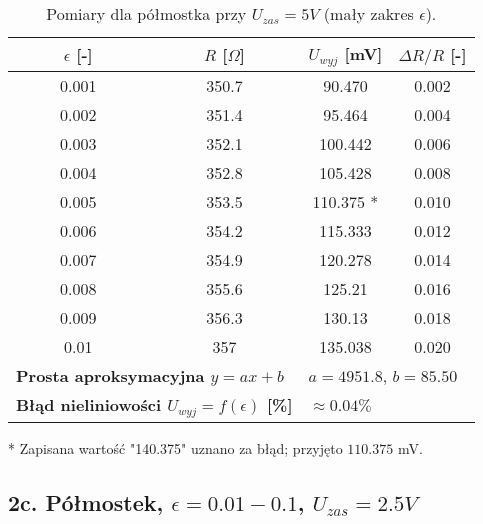 \documentclass[12pt, a4paper]{article}
\begin{document}
	\begin{table}[H]
		\centering
		\caption{Pomiary dla półmostka przy $U_{zas} = 5 V$ (mały zakres $\epsilon$).}
		\begin{tabular}{cccc}
			\toprule
			$\epsilon$ [-] & $R$ [$\Omega$] & $U_{wyj}$ [mV] & $\Delta R/R$ [-] \\
			\midrule
			0.001 & 350.7 & 90.470 & 0.002 \\
			0.002 & 351.4 & 95.464 & 0.004 \\
			0.003 & 352.1 & 100.442 & 0.006 \\
			0.004 & 352.8 & 105.428 & 0.008 \\
			0.005 & 353.5 & 110.375 * & 0.010 \\
			0.006 & 354.2 & 115.333 & 0.012 \\
			0.007 & 354.9 & 120.278 & 0.014 \\
			0.008 & 355.6 & 125.21 & 0.016 \\
			0.009 & 356.3 & 130.13 & 0.018 \\
			0.01 & 357 & 135.038 & 0.020 \\
			\midrule
			\multicolumn{2}{l}{\textbf{Prosta aproksymacyjna $y = ax + b$}} & \multicolumn{2}{l}{$a = 4951.8$, $b = 85.50$} \\
			\multicolumn{2}{l}{\textbf{Błąd nieliniowości $U_{wyj} = f(\epsilon)$ [\%]}} & \multicolumn{2}{l}{$\approx 0.04 \%$} \\
			\bottomrule
		\end{tabular}
		\footnotesize{* Zapisana wartość "140.375" uznano za błąd; przyjęto $110.375$ mV.}
	\end{table}
	
	\subsection{2c. Półmostek, $\epsilon = 0.01-0.1$, $U_{zas} = 2.5 V$}
	
\end{document}
